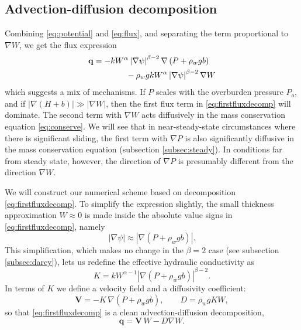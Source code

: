 \documentclass[gmd]{copernicus}   %
\newcommand\bV{\mathbf{V}}
\newcommand\bq{\mathbf{q}}
\newcommand{\grad}{\nabla}
\begin{document}
\subsection{Advection-diffusion decomposition}  Combining \eqref{eq:potential} and \eqref{eq:flux}, and separating the term proportional to $\grad W$, we get the flux expression
\begin{align}
\bq &= - k  W^\alpha \left|\grad \psi\right|^{\beta-2} \grad \left(P + \rho_w g b\right)  \label{eq:firstfluxdecomp} \\
    &\qquad\qquad - \rho_w g k W^\alpha \left|\grad \psi\right|^{\beta-2} \grad W  \notag
\end{align}
which suggests a mix of mechanisms.  If $P$ scales with the overburden pressure $P_o$, and if $|\grad (H+b)| \gg |\grad W|$, then the first flux term in \eqref{eq:firstfluxdecomp} will dominate.  The second term with $\grad W$ acts diffusively in the mass conservation equation \eqref{eq:conserve}.  We will see that in near-steady-state circumstances where there is significant sliding, the first term with $\grad P$ is also significantly diffusive in the mass conservation equation (subsection \ref{subsec:steady}).  In conditions far from steady state, however, the direction of $\grad P$ is presumably different from the direction $\grad W$.

We will construct our numerical scheme based on decomposition \eqref{eq:firstfluxdecomp}.  To simplify the expression slightly, the small thickness approximation $W\approx 0$ is made inside the absolute value signs in \eqref{eq:firstfluxdecomp}, namely
\begin{equation}
\left|\grad \psi\right| \approx \left|\grad \left(P + \rho_w g b \right)\right|.  \label{eq:Wsmall}
\end{equation}
This simplification, which makes no change in the $\beta=2$ case (see subsection \ref{subsec:darcy}), lets us redefine the effective hydraulic conductivity as
\begin{equation}
K = k W^{\alpha-1} \left|\grad(P+\rho_w g b)\right|^{\beta - 2}. \label{eq:Kdefine}
\end{equation}
In terms of $K$ we define a velocity field and a diffusivity coefficient:
\begin{equation} \label{eq:vexpression}
  \bV = - K\, \grad \left(P + \rho_w g b\right), \qquad D = \rho_w g K W,
\end{equation}
so that \eqref{eq:firstfluxdecomp} is a clean advection-diffusion decomposition,
\begin{equation} \label{eq:qexpression}
  \bq = \bV\, W - D \grad W.
\end{equation}
\end{document}

